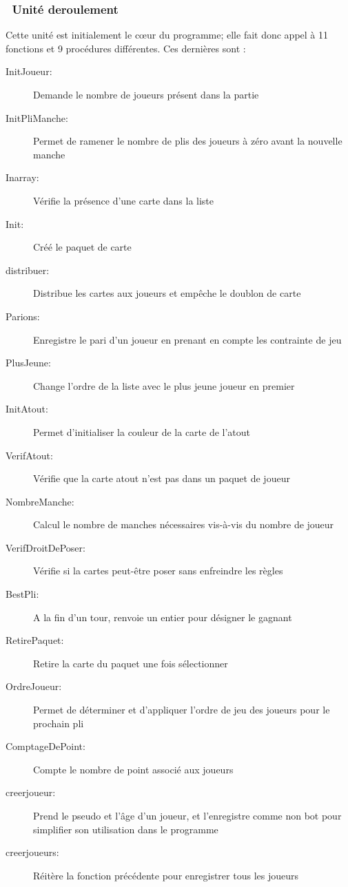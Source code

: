 \documentclass[12pt]{report}
\begin{document}
	\subsubsection{\cdot ~Unité deroulement}
 Cette unité est initialement le cœur du programme; elle fait donc appel à 11 fonctions et 9 procédures différentes. Ces dernières sont : \\
  \begin{description}
 \item[InitJoueur:] Demande le nombre de joueurs présent dans la partie
 \item[InitPliManche:] Permet de ramener le nombre de plis des joueurs à zéro avant la nouvelle manche
 \item[Inarray:] Vérifie la présence d'une carte dans la liste
 \item[Init:] Créé le paquet de carte
 \item[distribuer:] Distribue les cartes aux joueurs et empêche le doublon de carte
\item[Parions:] Enregistre le pari d’un joueur en prenant en compte les contrainte de jeu 
\item[PlusJeune:] Change l’ordre de la liste avec le plus jeune joueur en premier
 \item[InitAtout:] Permet d'initialiser la couleur de la carte de l'atout
\item[VerifAtout:] Vérifie que la carte atout n’est pas dans un paquet de joueur
 \item[NombreManche:] Calcul le nombre de manches nécessaires vis-à-vis du nombre de joueur
 \item[VerifDroitDePoser:] Vérifie si la cartes peut-être poser sans enfreindre les règles
 \item[BestPli:] A la fin d'un tour, renvoie un entier pour désigner le gagnant
 \item[RetirePaquet:] Retire la carte du paquet une fois sélectionner
 \item[OrdreJoueur:] Permet de déterminer et d'appliquer l'ordre de jeu des joueurs pour le prochain pli
 \item[ComptageDePoint:] Compte le nombre de point associé aux joueurs
 \item[creerjoueur:] Prend le pseudo et l’âge d’un joueur, et l’enregistre comme non bot pour simplifier son utilisation dans le programme
\item[creerjoueurs:] Réitère la fonction précédente pour enregistrer tous les joueurs
 \end{description}
  \vspace{15pt}
  
\end{document}
